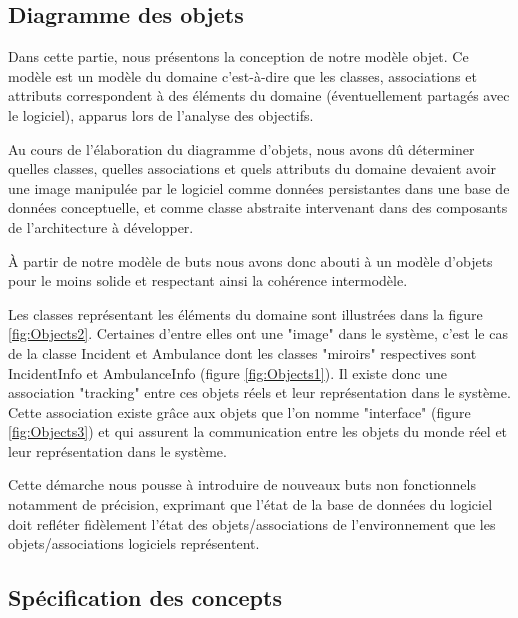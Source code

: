 \subsection{Diagramme des objets}

	Dans cette partie, nous présentons la conception de notre modèle objet. Ce
	modèle est un modèle du domaine c'est-à-dire que les classes, associations
	et attributs correspondent à des éléments du domaine (éventuellement
	partagés avec le logiciel), apparus lors de l'analyse des objectifs. 

	Au cours de l'élaboration du diagramme d'objets, nous avons dû déterminer
	quelles classes, quelles associations et quels attributs du domaine devaient avoir une
	image manipulée par le logiciel comme données persistantes dans une base de
	données conceptuelle, et comme classe abstraite intervenant dans des
	composants de l'architecture à développer. 

	À partir de notre modèle de buts nous avons donc abouti à un modèle d'objets
	pour le moins solide et respectant ainsi la cohérence intermodèle. 

	Les classes représentant les éléments du domaine sont illustrées dans la
	figure \ref{fig:Objects2}. Certaines d'entre elles ont une "image" dans le système, c'est
	le cas de la classe Incident et Ambulance dont les classes "miroirs"
	respectives sont IncidentInfo et AmbulanceInfo (figure  \ref{fig:Objects1}). Il existe donc
	une association "tracking" entre ces objets réels et leur représentation
	dans le système. Cette association existe grâce aux objets que l'on nomme
	"interface" (figure  \ref{fig:Objects3}) et qui assurent la communication entre les objets du
	monde réel et leur représentation dans le système. 

	Cette démarche nous pousse à introduire de nouveaux buts non fonctionnels
	notamment de précision, exprimant que l'état de la base de données du
	logiciel doit refléter fidèlement l'état des objets/associations de
	l'environnement que les objets/associations logiciels représentent. 


\subsection{Spécification des concepts}

